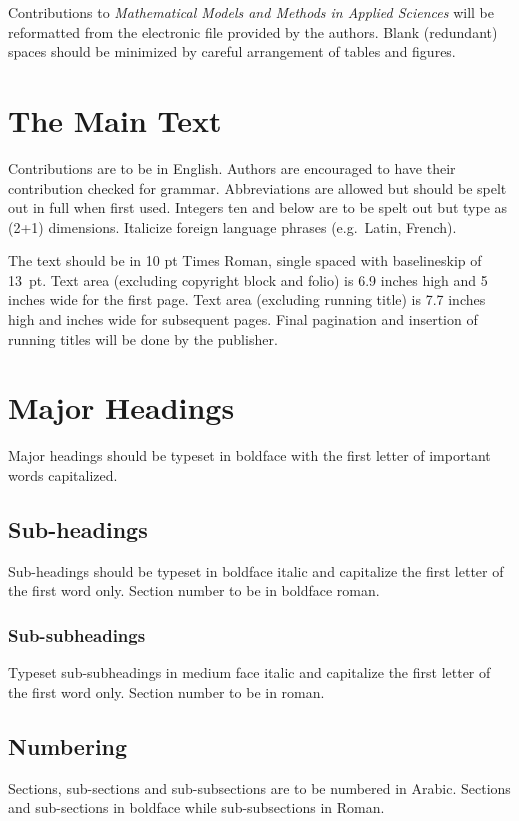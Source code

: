 \documentclass{ws-m3as}
\begin{document}
Contributions to {\it Mathematical Models and Methods in Applied Sciences}
will be reformatted from the electronic file provided by the
authors. Blank (redundant) spaces should be minimized by careful
arrangement of tables and\break
figures.

\section{The Main Text}
Contributions are to be in English. Authors are encouraged to
have their contribution checked for grammar. Abbreviations
are allowed but should be spelt out in full when first used.
Integers ten and below are to be spelt out but type as (2+1)
dimensions.  Italicize foreign language phrases (e.g.~Latin, French).

The text should be in 10 pt Times Roman, single spaced with
baselineskip of 13~pt. Text area (excluding copyright block and folio)
is 6.9 inches high and 5 inches wide for the first page.
Text area (excluding running title) is 7.7 inches high and inches wide for subsequent pages.  Final pagination and
insertion of running titles will be done by the publisher.

\section{Major Headings}
Major headings should be typeset in boldface with the first
letter of important words capitalized.

\subsection{Sub-headings}
Sub-headings should be typeset in boldface italic and capitalize
the first letter of the first word only. Section number to be in
boldface roman.

\subsubsection{Sub-subheadings}
Typeset sub-subheadings in medium face italic and capitalize the
first letter of the first word only. Section number to be in
roman.

\subsection{Numbering}
Sections, sub-sections and sub-subsections are to be numbered in
Arabic.  Sections and sub-sections in boldface while
sub-subsections in Roman.
\end{document}
